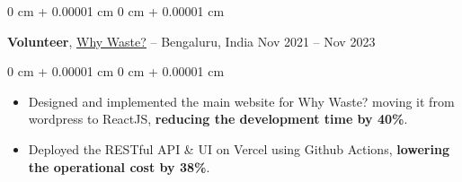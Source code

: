\documentclass[10pt, a4paper]{article}
\newenvironment{highlights}{
    \begin{itemize}[
        topsep=0 cm,
        parsep=0 cm,
        partopsep=0pt,
        itemsep=0pt,
        leftmargin=0 cm + 10pt
    ]
}{
    \end{itemize}
} %
\newenvironment{onecolentry}{
    \begin{adjustwidth}{
        0 cm + 0.00001 cm
    }{
        0 cm + 0.00001 cm
    }
}{
    \end{adjustwidth}
} %
\newenvironment{twocolentry}[2][]{
    \onecolentry
    \def\secondColumn{#2}
    \setcolumnwidth{\fill, 6.0 cm}
    \begin{paracol}{2}
}{
    \switchcolumn \raggedleft \secondColumn
    \end{paracol}
    \endonecolentry
} %
\begin{document}
        \vspace{0.10 cm}

        \begin{twocolentry}{
            Nov 2021 – Nov 2023
        }
            \textbf{Volunteer}, \href{https://www.whywaste.io/}{\underline{Why Waste?}} -- Bengaluru, India\end{twocolentry}

        \vspace{0.10 cm}
        \begin{onecolentry}
            \begin{highlights}
                \item Designed and implemented the main website for Why Waste? moving it from wordpress to ReactJS, \textbf{reducing the development time by 40\%}. 
                \item Deployed the RESTful API \& UI on Vercel using Github Actions, \textbf{lowering the operational cost by 38\%}.
            \end{highlights}
        \end{onecolentry}
    

            

\end{document}
